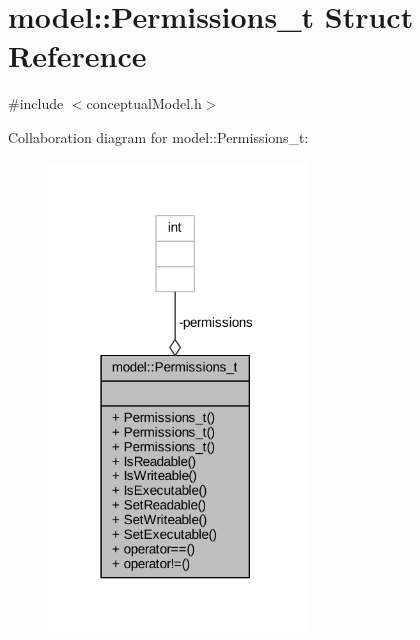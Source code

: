 \hypertarget{structmodel_1_1_permissions__t}{}\section{model\+:\+:Permissions\+\_\+t Struct Reference}
\label{structmodel_1_1_permissions__t}


{\ttfamily \#include $<$conceptual\+Model.\+h$>$}



Collaboration diagram for model\+:\+:Permissions\+\_\+t\+:
\nopagebreak
\begin{figure}[H]
\begin{center}
\leavevmode
\includegraphics[width=195pt]{structmodel_1_1_permissions__t__coll__graph}
\end{center}
\end{figure}
